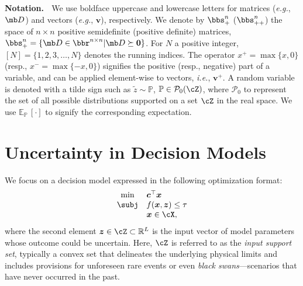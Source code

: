 \documentclass[opre, blindrev]{informs4}
\newcommand{\1}[1]{\mathds{1}{\left(#1\right)}}
\begin{document}
\noindent\textbf{Notation.} $\;$
We use boldface uppercase and lowercase letters for matrices (\textit{e.g.}, $\mb D$) and vectors (\textit{e.g.}, $\bm v$), respectively. We denote by $\bbs_+^n$ ($\bbs_{++}^n$) the space of $n \times n$ positive semidefinite (positive definite) matrices, \ie $\bbs_+^n = \{ \mb D \in \bbr^{n \times n} | \mb D \succeq \bm 0 \}$. For $N$ a positive integer, $[N] = \{1,2,3,\ldots,N\}$ denotes the running indices. The operator $x^+ = \max\{x, 0\}$ (resp., $x^- = \max\{-x, 0\}$) signifies the positive (resp., negative) part of a variable, and can be applied element-wise to vectors, \textit{i.e.}, $\bm{v}^+$. A random variable is denoted with a tilde sign such as $\tilde{z} \sim \mathbb{P}$, $\mathbb{P} \in \mathcal{P}_0(\cZ)$, where $\mathcal{P}_0$ to represent the set of all possible distributions supported on a set $\cZ$ in the real space. We use $\mathbb{E}_{\mathbb{P}}\,[\cdot]$ to signify the corresponding expectation.


\section{Uncertainty in Decision Models}
\label{sec:uncertainty_metric_RO}

We focus on a decision model expressed in the following optimization format:
\[
\begin{array}{cl}
\min & \bm c^\top \bm x \\
\subj & f(\bm x,\bm z) \leq \tau \\
& \bm x \in \cX,
\end{array}
\]
where the second element ${\bm z} \in \cZ \subset \mathbb{R}^{L}$ is the input vector of model parameters whose outcome could be uncertain. 
Here, $\cZ$ is referred to as the \textit{input support set}, typically a convex set that delineates the underlying physical limits and includes provisions for unforeseen rare events or even \textit{black swans}---scenarios that have never occurred in the past. 
\end{document}

